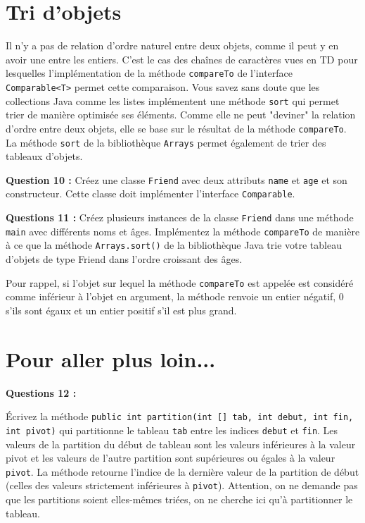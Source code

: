 \documentclass[iutinfo, a4paper, nocorrection, 10pt]{ustl-tdtp}
\begin{document}
\section{Tri d'objets}

Il n'y a pas de relation d'ordre naturel entre deux objets, comme il peut y en avoir une entre les entiers. C'est le cas des chaînes de caractères vues en TD pour lesquelles l'implémentation  de la méthode \texttt{compareTo} de l'interface \texttt{Comparable<T>} permet cette comparaison.
Vous savez sans doute que les collections Java comme les listes implémentent une méthode \texttt{sort} qui permet trier de manière optimisée ses éléments. Comme elle ne peut "deviner" la relation d'ordre entre deux objets, elle se base sur le résultat de la méthode \texttt{compareTo}. La méthode \texttt{sort} de la bibliothèque \texttt{Arrays} permet également de trier des tableaux d'objets.\newline

\textbf{Question 10 : }\newline
Créez une classe \texttt{Friend} avec deux attributs \texttt{name} et \texttt{age} et son constructeur. Cette classe doit implémenter l'interface \texttt{Comparable}.\newline

\textbf{Questions 11 : }\newline
Créez plusieurs instances de la classe \texttt{Friend} dans une méthode \texttt{main} avec différents noms et âges. Implémentez la méthode \texttt{compareTo} de manière à ce que la méthode \texttt{Arrays.sort()} de la bibliothèque Java trie votre tableau d'objets de type Friend dans l'ordre croissant des âges.\newline

Pour rappel, si l'objet sur lequel la méthode \texttt{compareTo} est appelée est considéré comme inférieur à l'objet en argument, la méthode renvoie un entier négatif, 0 s'ils sont égaux et un entier positif s'il est plus grand.


\section{Pour aller plus loin...}
\textbf{Questions 12 : }\newline

Écrivez la méthode \texttt{public int partition(int [] tab, int debut, int fin, int pivot)} qui partitionne le tableau  \texttt{tab} entre les indices \texttt{debut} et \texttt{fin}. Les valeurs de la partition du début de tableau sont les valeurs inférieures à la valeur pivot et les valeurs de l'autre partition  sont supérieures ou égales à la valeur \texttt{pivot}. La méthode retourne l'indice de la dernière valeur de la partition de début (celles des valeurs strictement inférieures à \texttt{pivot}).
Attention, on ne demande pas que les partitions soient elles-mêmes triées, on ne cherche ici qu'à partitionner le tableau.\newline
\end{document}
